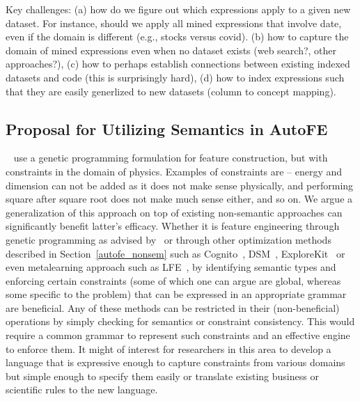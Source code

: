 \documentclass[sigconf]{acmart}
\begin{document}
Key challenges: (a) how do we figure out which expressions apply to a given new dataset.  For instance, should we apply all mined expressions that involve date, even if the domain is different (e.g., stocks versus covid).  (b) how to capture the domain of mined expressions even when no dataset exists (web search?, other approaches?), (c) how to perhaps establish connections between existing indexed datasets and code (this is surprisingly hard), (d) how to index expressions such that they are easily generlized to new datasets (column to concept mapping).

\subsection{Proposal for Utilizing Semantics in AutoFE}
~\cite{cherrier2019consistent} use a genetic programming formulation for feature construction, but with constraints in the domain of physics. Examples of constraints are -- energy and dimension can not be added as it does not make sense physically, and performing square after square root does not make much sense either, and so on. We argue a generalization of this approach on top of existing non-semantic approaches can significantly benefit latter's efficacy. Whether it is feature engineering through genetic programming as advised by~\cite{cherrier2019consistent} or through other optimization methods described in Section~\ref{autofe_nonsem} such as Cognito~\cite{khurana2018feature}, DSM~\cite{kanter:dsm}, ExploreKit~\cite{DBLP:conf/icdm/KatzSS16} or even metalearning approach such as LFE~\cite{lfe}, by identifying semantic types and enforcing certain constraints (some of which one can argue are global, whereas some specific to the problem) that can be expressed in an appropriate grammar are beneficial. Any of these methods can be restricted in their (non-beneficial) operations by simply checking for semantics or constraint consistency. 
This would require a common grammar to represent such constraints and an effective engine to enforce them. It might of interest for researchers in this area to develop a language that is expressive enough to capture constraints from various domains but simple enough to specify them easily or translate existing business or scientific rules to the new language.
\end{document}
